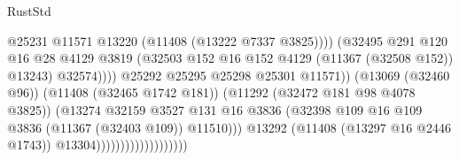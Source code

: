 \begin{lexlean}{RustStd}
\begin{coremodule}
                                                          @25231
                                                          @11571
                                                          @13220
                                                          (@11408 (@13222 @7337 @3825))))
                                                      (@32495
                                                        @291
                                                        @120
                                                        @16
                                                        @28
                                                        @4129
                                                        @3819
                                                        (@32503
                                                          @152
                                                          @16
                                                          @152
                                                          @4129
                                                          (@11367 (@32508 @152))
                                                          @13243)
                                                        @32574))))
                                                @25292
                                                @25295
                                                @25298
                                                @25301
                                                @11571))
                                            (@13069 (@32460 @96))
                                            (@11408 (@32465 @1742 @181))
                                            (@11292 (@32472 @181 @98 @4078 @3825))
                                            (@13274
                                              @32159
                                              @3527
                                              @131
                                              @16
                                              @3836
                                              (@32398
                                                @109
                                                @16
                                                @109
                                                @3836
                                                (@11367 (@32403 @109))
                                                @11510)))
                                          @13292
                                          (@11408 (@13297 @16 @2446 @1743))
                                          @13304)))))))))))))))))))

\end{coremodule}
\end{lexlean}
